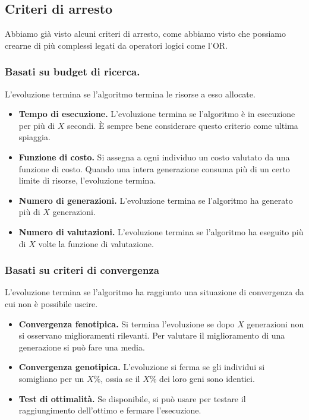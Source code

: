         \subsection{Criteri di arresto}
            Abbiamo già visto alcuni criteri di arresto, come abbiamo visto che possiamo crearne di più complessi legati da operatori logici come l'OR.
            
            \subsubsection{Basati su budget di ricerca.} 
                L'evoluzione termina se l'algoritmo termina le risorse a esso allocate.
                
                \begin{itemize}
                    \item \textbf{Tempo di esecuzione.} L'evoluzione termina se l'algoritmo è in esecuzione per più di $X$ secondi. È sempre bene considerare questo criterio come ultima spiaggia.
                    
                    \item \textbf{Funzione di costo.} Si assegna a ogni individuo un costo valutato da una funzione di costo. Quando una intera generazione consuma più di un certo limite di risorse, l'evoluzione termina.
                    
                    \item \textbf{Numero di generazioni.} L'evoluzione termina se l'algoritmo ha generato più di $X$ generazioni.
                    
                    \item \textbf{Numero di valutazioni.} L'evoluzione termina se l'algoritmo ha eseguito più di $X$ volte la funzione di valutazione.
                \end{itemize}
            
            \subsubsection{Basati su criteri di convergenza}
                L'evoluzione termina se l'algoritmo ha raggiunto una situazione di convergenza da cui non è possibile uscire.
                
                \begin{itemize}
                    \item \textbf{Convergenza fenotipica.} Si termina l'evoluzione se dopo $X$ generazioni non si osservano miglioramenti rilevanti. Per valutare il miglioramento di una generazione si può fare una media.
                    
                    \item \textbf{Convergenza genotipica.} L'evoluzione si ferma se gli individui si somigliano per un $X\%$, ossia se il $X\%$ dei loro geni sono identici.
                    
                    \item \textbf{Test di ottimalità.} Se disponibile, si può usare per testare il raggiungimento dell'ottimo e fermare l'esecuzione.
                \end{itemize}
                
